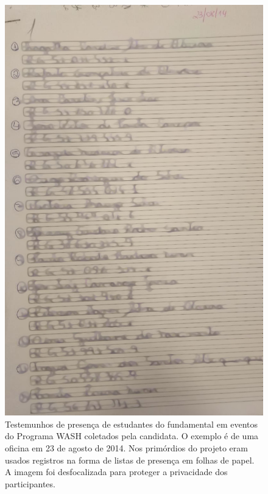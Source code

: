 \documentclass[
12pt,		%
openright,	%
twoside,  %
a4paper,			%
chapter=TITLE,		%
english,			%
french,				%
spanish,			%
brazil				%
]{USPSC-classe/USPSC}
\begin{document}
\begin{figure}[max size={\textwidth}{\textheight}]
\begin{minipage}[b]{0.4\linewidth}
        \centering
                \includegraphics[width=1.0\linewidth]{../../imagens/blurred-Presenca-Oficina-2014-08-23.jpeg}
                \caption{Testemunhos de presen\c{c}a de estudantes do fundamental em eventos do Programa WASH coletados pela candidata. O exemplo \'e de uma oficina em 23 de agosto de 2014. Nos prim\'ordios do projeto eram usados registros na forma de listas de presen\c{c}a em folhas de papel. A imagem foi desfocalizada para proteger a privacidade dos participantes.}
                \label{dec219c809788f521312f8d75d2f5591f069f132}
\end{minipage}%
\hspace{0.5cm}

\end{figure}
\end{document}
